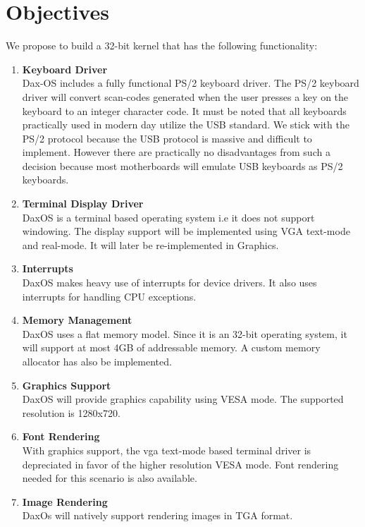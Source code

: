 \section{Objectives}\label{section:Objectives}
We propose to build a 32-bit kernel that has the following functionality:
\begin{enumerate}
	
	\item \textbf{Keyboard Driver} \\
	Dax-OS includes a fully functional PS/2 keyboard driver. The PS/2 keyboard driver will convert scan-codes generated when the user presses a key on the keyboard to an integer character code. It must be noted that all keyboards practically used in modern day utilize the USB standard. We stick with the PS/2 protocol because the USB protocol is massive and difficult to implement. However there are practically no disadvantages from such a decision because most motherboards will emulate USB keyboards as PS/2 keyboards.
	
	\item \textbf{Terminal Display Driver} \\
	DaxOS is a terminal based operating system i.e it does not support windowing.
	The display support will be implemented using VGA text-mode and real-mode.
	It will later be re-implemented in Graphics.
	
	\item \textbf{Interrupts}  \\
	DaxOS makes heavy use of interrupts for device drivers. It also uses interrupts for handling CPU exceptions. 

	\item \textbf{Memory Management} \\
	DaxOS uses a flat memory model.
	Since it is an 32-bit operating system, it will support at most 4GB of addressable memory. 
	A custom memory allocator has also be implemented.

	\item \textbf{Graphics Support} \\
	DaxOS will provide graphics capability using VESA mode. The supported resolution is 1280x720. 
	\pagebreak

	\item \textbf{Font Rendering} \\
	With graphics support, the vga text-mode based terminal driver is depreciated in favor of the higher resolution VESA mode.
	Font rendering needed for this scenario is also available.

	\item \textbf{Image Rendering} \\
	DaxOs will natively support rendering images in TGA format.
\end{enumerate}

